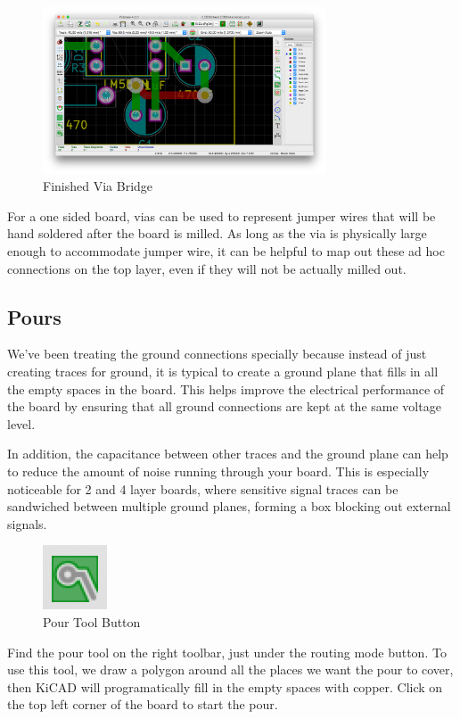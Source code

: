 \documentclass[12pt, oneside]{article}
\begin{document}
\begin{figure}[H]
\includegraphics[width=0.75\textwidth]{AfterVia}
\centering
\caption{Finished Via Bridge}
\end{figure}

For a one sided board, vias can be used to represent jumper wires that will be hand soldered after the board is milled. As long as the via is physically large enough to accommodate jumper wire, it can be helpful to map out these ad hoc connections on the top layer, even if they will not be actually milled out.
\subsection{Pours}
We've been treating the ground connections specially because instead of just creating traces for ground, it is typical to create a ground plane that fills in all the empty spaces in the board. This helps improve the electrical performance of the board by ensuring that all ground connections are kept at the same voltage level. 

In addition, the capacitance between other traces and the ground plane can help to reduce the amount of noise running through your board. This is especially noticeable for 2 and 4 layer boards, where sensitive signal traces can be sandwiched between multiple ground planes, forming a box blocking out external signals.

\begin{figure}[H]
\includegraphics{PourButton}
\centering
\caption{Pour Tool Button}
\end{figure}

Find the pour tool on the right toolbar, just under the routing mode button. To use this tool, we draw a polygon around all the places we want the pour to cover, then KiCAD will programatically fill in the empty spaces with copper. Click on the top left corner of the board to start the pour. 
\end{document}
